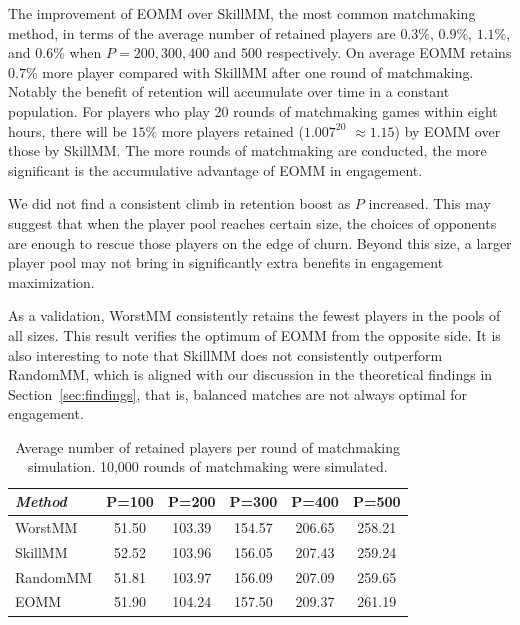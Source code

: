 The improvement of EOMM over SkillMM, the most common matchmaking method, in terms of the average number of retained players are $0.3\%$, $0.9\%$, $1.1\%$, and $0.6\%$ when $P=200, 300, 400$ and $500$ respectively. On average EOMM retains $0.7\%$ more player compared with SkillMM after one round of matchmaking. Notably the benefit of retention will accumulate over time in a constant population. For players who play 20 rounds of matchmaking games within eight hours, there will be $15\%$ more players retained ($1.007^{20}$ $ \approx 1.15$) by EOMM over those by SkillMM. The more rounds of matchmaking are conducted, the more significant is the accumulative advantage of EOMM in engagement.

We did not find a consistent climb in retention boost as $P$ increased. This may suggest that when the player pool reaches certain size, the choices of opponents are enough to rescue those players on the edge of churn. Beyond this size, a larger player pool may not bring in significantly extra benefits in engagement maximization.

As a validation, WorstMM consistently retains the fewest players in the pools of all sizes. This result verifies the optimum of EOMM from the opposite side. It is also interesting to note that SkillMM does not consistently outperform RandomMM, which is aligned with our discussion in the theoretical findings in Section~\ref{sec:findings}, that is, balanced matches are not always optimal for engagement.


\begin{table}[t]
\centering
{}
\caption{Average number of retained players per round of matchmaking simulation. 10,000 rounds of matchmaking were simulated.}
\label{tab:result}
\begin{tabular}{lccccc}
\hline
\emph{Method} & \multicolumn{1}{c}{P=100} & \multicolumn{1}{c}{P=200} & \multicolumn{1}{c}{P=300} & \multicolumn{1}{c}{P=400} & \multicolumn{1}{c}{P=500} \\ \hline
WorstMM  & 51.50   & 103.39   & 154.57    & 206.65  &  258.21  \\ \hline
SkillMM  & 52.52   & 103.96   & 156.05    & 207.43  &  259.24  \\ \hline
RandomMM & 51.81   & 103.97   & 156.09    & 207.09  &  259.65  \\ \hline
EOMM     & 51.90   & 104.24   & 157.50    & 209.37  &  261.19  \\ \hline
\end{tabular}
\end{table}



